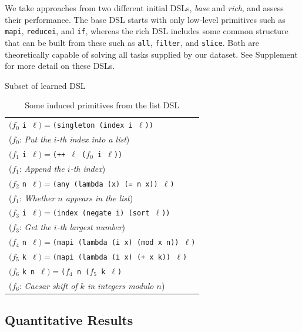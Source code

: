 \documentclass{article}
\newcommand{\code}[1]{{\footnotesize\texttt{#1}}}
\begin{document}
We take approaches from two different initial DSLs, \emph{base} and
\emph{rich}, and assess their performance. The base DSL starts with only
low-level primitives such as \code{mapi}, \code{reducei}, and
\code{if}, whereas the rich DSL includes some common structure that can be
built from these such as \code{all}, \code{filter}, and \code{slice}.
Both are theoretically capable of solving all tasks supplied by our dataset.
See Supplement for more detail on these DSLs.

\begin{table}[t]
  \centering
  Subset of learned DSL\\
  \begin{tabular}{l}
    \toprule
    $(f_0$ \code{i $\ell$}$) = $\code{(singleton (index i $\ell$))}\\
    \hspace{0.5cm}($f_0$: \emph{Put the $i$-th index into a list})\\
    $(f_1$ \code{i $\ell$}$) = $\code{(++ $\ell$ ($f_0$ i $\ell$))}\\
    \hspace{0.5cm}($f_1$: \emph{Append the $i$-th index})\\
    $(f_2$ \code{n $\ell$}$) = $\code{(any (lambda (x) (= n x)) $\ell$)}\\
    \hspace{0.5cm}($f_1$: \emph{Whether $n$ appears in the list})\\
    $(f_3$ \code{i $\ell$}$) = $\code{(index (negate i) (sort $\ell$))}\\
    \hspace{0.5cm}($f_3$: \emph{Get the $i$-th largest number})\\
    $(f_4$ \code{n $\ell$}$) = $\code{(mapi (lambda (i x) (mod x n)) $\ell$)}\\
    $(f_5$ \code{k $\ell$}$) = $\code{(mapi (lambda (i x) (+ x k)) $\ell$)}\\
    $(f_6$ \code{k n $\ell$}$) = $\code{($f_4$ n ($f_5$ k $\ell$)}\\
    \hspace{0.5cm}($f_6$: \emph{Caesar shift of $k$ in integers modulo $n$})\\
  \bottomrule
  \end{tabular}
  \caption{Some induced primitives from the list DSL}\label{listinduced}
\end{table}


\subsection{Quantitative Results}\label{quantitative}
\end{document}
